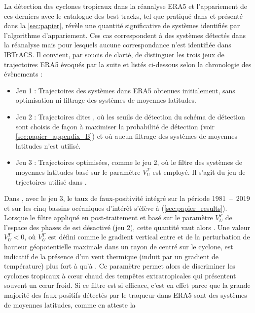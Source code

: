 \documentclass[../main.tex]{subfiles}
\begin{document}
La détection des cyclones tropicaux dans la réanalyse ERA5 et l'appariement de ces derniers avec le catalogue des best tracks, tel que pratiqué dans
\textcite{dulac_assessing_2023} et présenté dans la \cref{sec:papier}, révèle une quantité significative de systèmes identifiés  par
l'algorithme d'appariement. Ces cas correspondent à des systèmes détectés dans la réanalyse mais pour lesquels aucune correspondance n'est identifiée dans
IBTrACS. Il convient, par soucis de clarté, de distinguer les trois jeux de trajectoires ERA5 évoqués par la suite et listés ci-dessous selon la chronologie des
évènements :
%
\begin{itemize}
    \item Jeu 1 : Trajectoires des systèmes dans ERA5 obtenues initialement, sans optimisation ni filtrage des systèmes de moyennes latitudes.
    \item Jeu 2 : Trajectoires dites , où les seuils de détection du schéma de détection sont choisis de façon à maximiser la probabilité
        de détection (voir \cref{sec:papier_appendix_B}) et où aucun filtrage des systèmes de moyennes latitudes n'est utilisé.
    \item Jeu 3 : Trajectoires optimisées, comme le jeu 2, où le filtre des systèmes de moyennes latitudes basé sur le paramètre $V_U^T$ est employé. Il s'agit
        du jeu de trjectoires utilisé dans \textcite{dulac_assessing_2023}.
\end{itemize}
%
Dans \textcite{dulac_assessing_2023}, avec le jeu 3, le taux de faux-positivité intégré sur la période \num{1981}~--~\num{2019} et sur les cinq bassins
océaniques d'intérêt s'élève à  (\cref{sec:papier_results}). Lorsque le filtre appliqué en post-traitement et basé sur le paramètre $V_U^T$ de l'espace
des phases de \textcite{hart_cyclone_2003} est désactivé (jeu 2), cette quantité vaut alors . Une valeur $V_U^T < 0$, où $V_U^T$ est défini comme le
gradient vertical entre  et  de la perturbation de hauteur géopotentielle maximale dans un rayon de  centré sur le cyclone, est
indicatif de la présence d'un vent thermique (induit par un gradient de température) plus fort à  qu'à . Ce paramètre permet alors de
discriminer les cyclones tropicaux à cœur chaud des tempêtes extratropicales qui présentent souvent un cœur froid. Si ce filtre est si efficace, c'est en effet
parce que la grande majorité des faux-positifs détectés par le traqueur dans ERA5 sont des systèmes de moyennes latitudes, comme en atteste la
\end{document}
